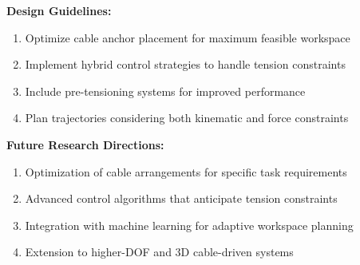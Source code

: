 \textbf{Design Guidelines:}
\begin{enumerate}
    \item Optimize cable anchor placement for maximum feasible workspace
    \item Implement hybrid control strategies to handle tension constraints
    \item Include pre-tensioning systems for improved performance
    \item Plan trajectories considering both kinematic and force constraints
\end{enumerate}

\textbf{Future Research Directions:}
\begin{enumerate}
    \item Optimization of cable arrangements for specific task requirements
    \item Advanced control algorithms that anticipate tension constraints
    \item Integration with machine learning for adaptive workspace planning
    \item Extension to higher-DOF and 3D cable-driven systems
\end{enumerate}